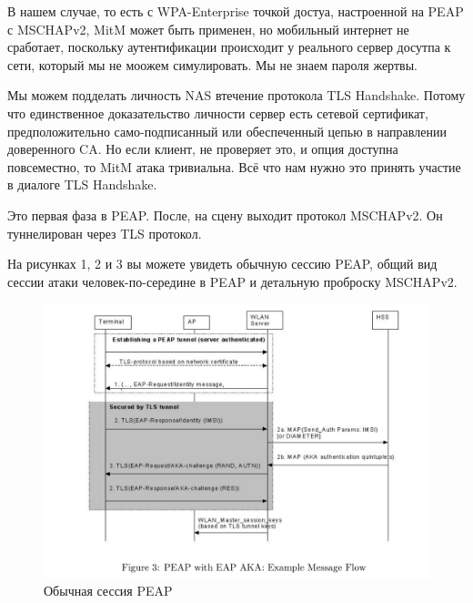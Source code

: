 \documentclass[oneside, final, 14pt]{extarticle}
\begin{document}
В нашем случае, то есть с WPA-Enterprise точкой достуа,
настроенной на PEAP с MSCHAPv2,
MitM может быть применен,
но мобильный интернет не сработает,
поскольку аутентификации происходит у реального сервер досутпа к сети,
который мы не моожем симулировать. Мы не знаем пароля жертвы.

Мы можем подделать личность NAS втечение протокола TLS Handshake.
Потому что единственное доказательство личности сервер
есть сетевой сертификат,
предположительно само-подписанный или обеспеченный цепью
в направлении доверенного CA. Но если клиент, не проверяет это,
и опция доступна повсеместно,
то MitM атака тривиальна.
Всё что нам нужно это принять участие в диалоге TLS Handshake.

Это первая фаза в PEAP. После, на сцену выходит протокол MSCHAPv2.
Он туннелирован через TLS протокол.

На рисунках 1, 2 и 3 вы можете увидеть обычную сессию PEAP,
общий вид сессии атаки человек-по-середине в PEAP
и детальную проброску MSCHAPv2.

\begin{figure}
  \centering \includegraphics{res/peap-session-fig.png}
  \caption{Обычная сессия PEAP}
\end{figure}
\end{document}
